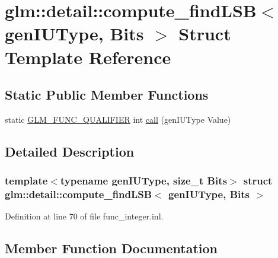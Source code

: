 \hypertarget{structglm_1_1detail_1_1compute__find_l_s_b}{}\section{glm\+::detail\+::compute\+\_\+find\+L\+SB$<$ gen\+I\+U\+Type, Bits $>$ Struct Template Reference}
\label{structglm_1_1detail_1_1compute__find_l_s_b}
\subsection*{Static Public Member Functions}
\begin{DoxyCompactItemize}
\item 
static \mbox{\hyperlink{setup_8hpp_a33fdea6f91c5f834105f7415e2a64407}{G\+L\+M\+\_\+\+F\+U\+N\+C\+\_\+\+Q\+U\+A\+L\+I\+F\+I\+ER}} int \mbox{\hyperlink{structglm_1_1detail_1_1compute__find_l_s_b_a1c0ec72e2bcf35a3109e85cfc536400b}{call}} (gen\+I\+U\+Type Value)
\end{DoxyCompactItemize}


\subsection{Detailed Description}
\subsubsection*{template$<$typename gen\+I\+U\+Type, size\+\_\+t Bits$>$\newline
struct glm\+::detail\+::compute\+\_\+find\+L\+S\+B$<$ gen\+I\+U\+Type, Bits $>$}



Definition at line 70 of file func\+\_\+integer.\+inl.



\subsection{Member Function Documentation}
\mbox{\label{structglm_1_1detail_1_1compute__find_l_s_b_a1c0ec72e2bcf35a3109e85cfc536400b}} 
